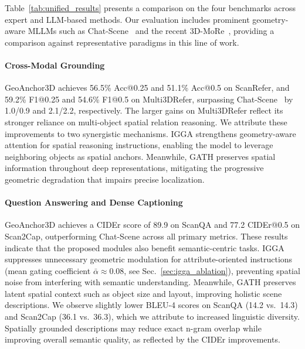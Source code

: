 \documentclass[lettersize,journal]{IEEEtran}
\begin{document}
Table~\ref{tab:unified_results} presents a comparison on the four benchmarks across expert and LLM-based methods. Our evaluation includes prominent geometry-aware MLLMs such as Chat-Scene~\cite{chatscene2024} and the recent 3D-MoRe~\cite{3D-MoRe2025}, providing a comparison against representative paradigms in this line of work.

\paragraph*{Cross-Modal Grounding} GeoAnchor3D achieves 56.5\% Acc@0.25 and 51.1\% Acc@0.5 on ScanRefer, and 59.2\% F1@0.25 and 54.6\% F1@0.5 on Multi3DRefer, surpassing Chat-Scene~\cite{chatscene2024} by 1.0/0.9 and 2.1/2.2, respectively. The larger gains on Multi3DRefer reflect its stronger reliance on multi-object spatial relation reasoning. We attribute these improvements to two synergistic mechanisms. IGGA strengthens geometry-aware attention for spatial reasoning instructions, enabling the model to leverage neighboring objects as spatial anchors. Meanwhile, GATH preserves spatial information throughout deep representations, mitigating the progressive geometric degradation that impairs precise localization.

\paragraph*{Question Answering and Dense Captioning} GeoAnchor3D achieves a CIDEr score of 89.9 on ScanQA and 77.2 CIDEr@0.5 on Scan2Cap, outperforming Chat-Scene across all primary metrics. These results indicate that the proposed modules also benefit semantic-centric tasks. IGGA suppresses unnecessary geometric modulation for attribute-oriented {instructions} ({mean gating coefficient} $\bar{\alpha} \approx 0.08$, see Sec.~\ref{sec:igga_ablation}), preventing spatial noise from interfering with semantic understanding. Meanwhile, GATH preserves latent spatial context such as object size and layout, improving holistic scene descriptions. We observe slightly lower BLEU-4 scores on ScanQA (14.2 vs.\ 14.3) and Scan2Cap (36.1 vs.\ 36.3), which we attribute to increased linguistic diversity. Spatially grounded descriptions may reduce exact n-gram overlap while improving overall semantic quality, as reflected by the CIDEr improvements.
\end{document}
